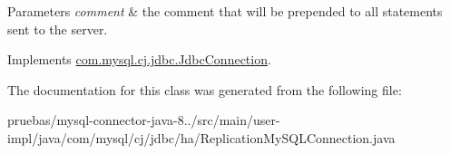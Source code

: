 \begin{DoxyParams}{Parameters}
{\em comment} & the comment that will be prepended to all statements sent to the server. \\
\hline
\end{DoxyParams}


Implements \mbox{\hyperlink{interfacecom_1_1mysql_1_1cj_1_1jdbc_1_1_jdbc_connection_adfbd59fbebd013673ed3eb97beb76179}{com.\+mysql.\+cj.\+jdbc.\+Jdbc\+Connection}}.



The documentation for this class was generated from the following file\+:\begin{DoxyCompactItemize}
\item 
pruebas/mysql-\/connector-\/java-\/8../src/main/user-\/impl/java/com/mysql/cj/jdbc/ha/Replication\+My\+S\+Q\+L\+Connection.\+java\end{DoxyCompactItemize}
